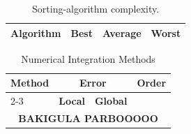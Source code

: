 \documentclass[11pt]{article}
\begin{document}
\begin{table}[htbp]
    \centering
    \caption{Sorting-algorithm complexity.}
    \begin{tabular}{l|c|c|c}
    \hline
    \textbf{Algorithm} & \textbf{Best} & \textbf{Average} & \textbf{Worst} \\
    \hline
    \end{tabular}
\end{table}


\begin{table}[H]
    \centering
    \caption{Numerical Integration Methods}
    \begin{tabular}{|l|c|c|c|}
        \hline
        \multirow{2}{*}{\textbf{Method}} & \multicolumn{2}{c|}{\textbf{Error}} & \multirow{2}{*}{\textbf{Order}} \\ 
        \cline{2-3}
        & \textbf{Local} & \textbf{Global} & \\
        \hline
        \multicolumn{4}{|c|}{\textbf{BAKIGULA PARBOOOOO}} \\
        \hline
    \end{tabular}
\end{table}
\end{document}
